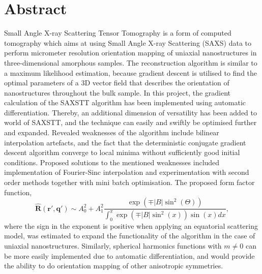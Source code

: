 


\begingroup
\let\clearpage\relax
\let\cleardoublepage\relax
\let\cleardoublepage\relax

\chapter*{Abstract}

Small Angle X-ray Scattering Tensor Tomography is a form of computed tomography
which aims at using Small Angle X-ray Scattering (SAXS) data to perform micrometer resolution orientation mapping
of uniaxial nanostructures in three-dimensional amorphous samples.
The reconstruction algorithm is similar to a maximum likelihood estimation, because gradient descent is utilised to find the optimal parameters of a 3D vector field
that describes the orientation of nanostructures throughout the bulk sample.
In this project, the gradient calculation of the SAXSTT algorithm has been implemented using automatic differentiation.
Thereby, an additional dimension of versatility has been added to world of SAXSTT, and the technique can easily and swiftly be optimised further and expanded.
Revealed weaknesses of the algorithm include bilinear interpolation artefacts,
and the fact that the deterministic conjugate gradient descent algorithm converge to local minima without sufficiently good initial conditions.
Proposed solutions to the mentioned weaknesses included implementation of Fourier-Sinc interpolation and experimentation with second order methods together with mini batch optimisation.
The proposed form factor function,
\begin{equation*}
    \bm{\widehat{R}}(\bm{r'}, \bm{q'}) \sim A_{0}^{2} + A_{1}^{2}\frac{ \exp\left(\mp |B| \sin^2(\Theta) \right) } {\int_{0}^{\pi} \exp\left( \mp |B| \sin^{2}(x) \right) \sin(x) dx},
\end{equation*}
where the sign in the exponent is positive when applying an equatorial scattering model, was estimated to expand the functionality of the algorithm in the case of uniaxial nanostructures.
Similarly, spherical harmonics functions with $m \neq 0$ can be more easily implemented due to automatic differentiation,
and would provide the ability to do orientation mapping of other anisotropic symmetries.


